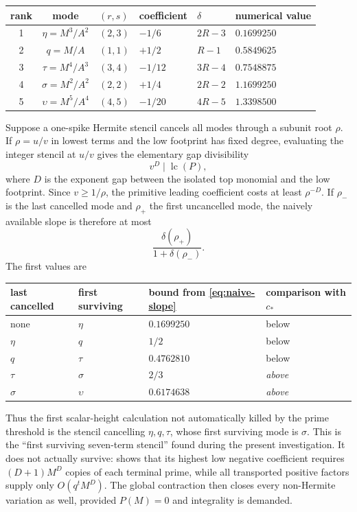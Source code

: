 \documentclass[11pt,oneside]{article}
\theoremstyle{definition}
\theoremstyle{remark}
\newcommand{\lc}{\operatorname{lc}}
\newcommand{\cstar}{c_{\!*}}
\begin{document}
\begin{center}
\begin{tabular}{ccllll}
\toprule
rank & mode & $(r,s)$ & coefficient & $\delta$ & numerical value\\
\midrule
1 & $\eta=M^3/A^2$ & $(2,3)$ & $-1/6$ & $2R-3$ & $0.1699250$\\
2 & $q=M/A$ & $(1,1)$ & $+1/2$ & $R-1$ & $0.5849625$\\
3 & $\tau=M^4/A^3$ & $(3,4)$ & $-1/12$ & $3R-4$ & $0.7548875$\\
4 & $\sigma=M^2/A^2$ & $(2,2)$ & $+1/4$ & $2R-2$ & $1.1699250$\\
5 & $\upsilon=M^5/A^4$ & $(4,5)$ & $-1/20$ & $4R-5$ & $1.3398500$\\
\bottomrule
\end{tabular}
\end{center}

Suppose a one-spike Hermite stencil cancels all modes through a subunit root $\rho$.  If
$\rho=u/v$ in lowest terms and the low footprint has fixed degree, evaluating the integer
stencil at $u/v$ gives the elementary gap divisibility
\[
 v^D\mid \lc(P),
\]
where $D$ is the exponent gap between the isolated top monomial and the low footprint.  Since
$v\ge1/\rho$, the primitive leading coefficient costs at least $\rho^{-D}$.  If $\rho_-$ is
the last cancelled mode and $\rho_+$ the first uncancelled mode, the naively available slope
is therefore at most
\begin{equation}
 \frac{\delta(\rho_+)}{1+\delta(\rho_-)}.              \label{eq:naive-slope}
\end{equation}
The first values are
\begin{center}
\begin{tabular}{llll}
\toprule
last cancelled & first surviving & bound from \eqref{eq:naive-slope} & comparison with $\cstar$\\
\midrule
none & $\eta$ & $0.1699250$ & below\\
$\eta$ & $q$ & $1/2$ & below\\
$q$ & $\tau$ & $0.4762810$ & below\\
$\tau$ & $\sigma$ & $2/3$ & \emph{above}\\
$\sigma$ & $\upsilon$ & $0.6174638$ & \emph{above}\\
\bottomrule
\end{tabular}
\end{center}

Thus the first scalar-height calculation not automatically killed by the prime threshold is
the stencil cancelling $\eta,q,\tau$, whose first surviving mode is $\sigma$.  This is the
``first surviving seven-term stencil'' found during the present investigation.  It does not
actually survive:  shows that its highest low negative coefficient
requires $(D+1)M^D$ copies of each terminal prime, while all transported positive factors
supply only $O(q^tM^D)$.  The global contraction then closes every non-Hermite variation as
well, provided $P(M)=0$ and integrality is demanded.
\end{document}
